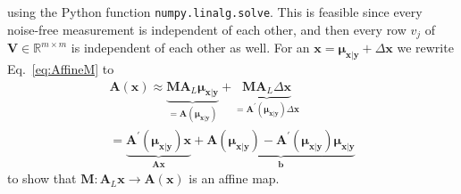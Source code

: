 using the Python function \texttt{numpy.linalg.solve}.
This is feasible since every noise-free measurement is independent of each other, and then every row $v_j$ of $\bm{V} \in \mathbb{R}^{m \times m}$ is independent of each other as well.
For an $\bm{x} = \bm{\mu}_{\bm{x}|\bm{y}} + \Delta \bm{x}$ we rewrite Eq.~\ref{eq:AffineM} to
\begin{align}
	\bm{A}(\bm{x})  \approx \underbrace{  \bm{M A}_L  \bm{\mu}_{\bm{x}|\bm{y}} }_{= \bm{A}( \bm{\mu}_{\bm{x}|\bm{y}} )  }+  \underbrace{\bm{M A}_L  \Delta \bm{x} }_{= \bm{A}^{\prime}( \bm{\mu}_{\bm{x}|\bm{y}} )  \Delta \bm{x} }\, \\
	=    \underbrace{ \bm{A}^{\prime}( \bm{\mu}_{\bm{x}|\bm{y}} ) \bm{x}}_{ \bm{A}\bm{x}}  +  \underbrace{ \bm{A}( \bm{\mu}_{\bm{x}|\bm{y}} )  - \bm{A}^{\prime}( \bm{\mu}_{\bm{x}|\bm{y}} ) \bm{\mu}_{\bm{x}|\bm{y}}}_{  \bm{b}}
\end{align}
to show that $ \bm{M}:\bm{A}_L\bm{x} \rightarrow \bm{A}(\bm{x})$ is an affine map.



